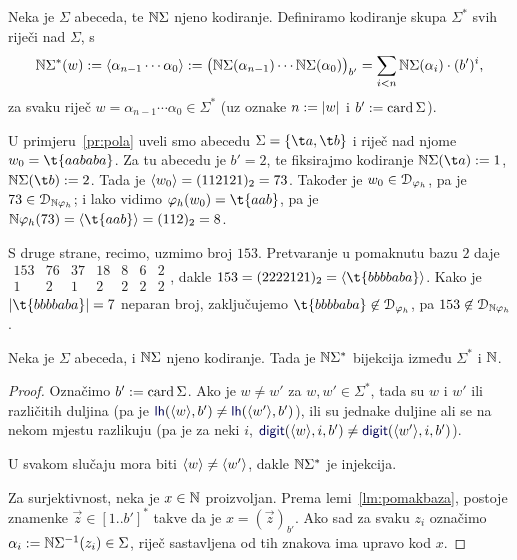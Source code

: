 \begin{definicija}
Neka je $\Sigma$ abeceda, te ${\mathbb N}\Sigma$ njeno kodiranje. Definiramo kodiranje skupa $\Sigma^*$ svih riječi nad $\Sigma$, s
\begin{equation}\label{eq:kodNSz}
    {\mathbb N}\Sigma^*(w):=\langle\alpha_{n-1}\dotsm\alpha_0\rangle:=\bigl({\mathbb N}\Sigma(\alpha_{n-1})\dotsm{\mathbb N}\Sigma(\alpha_0)\bigr)_{b'}=\sum_{i<n}{\mathbb N}\Sigma(\alpha_i)\cdot(b')^i\text,
\end{equation}
za svaku riječ $w=\alpha_{n-1}\dotsm\alpha_0\in\Sigma^*$ (uz oznake $n:=\lvert w\rvert$ i $b':=\operatorname{card}\Sigma$).
\end{definicija}

\begin{primjer}
U primjeru~\ref{pr:pola} uveli smo abecedu $\Sigma=\{\t a,\t b\}$ i riječ nad njome $w_0=\t{aababa}$. Za tu abecedu je $b'=2$, te fiksirajmo kodiranje $\N\Sigma(\t a):=1$, $\N\Sigma(\t b):=2$. Tada je $\langle w_0\rangle=(112121)_2=73$.
Također je $w_0\in\mathcal D_{\varphi_h}$, pa je $73\in\mathcal D_{{\mathbb N}\varphi_h}$; i lako vidimo $\varphi_h(w_0)=\t{aab}$, pa je
$\N\varphi_h(73)=\kr{\t{aab}}=(112)_2=8$.

S druge strane, recimo, uzmimo broj $153$. Pretvaranje u pomaknutu bazu $2$ daje
$\begin{array}{rrrrrrr}
153 & 76 & 37 & 18 & 8 & 6 & 2\\\hline
1 & 2 & 1 & 2 & 2 & 2 & 2
\end{array}$, dakle $153=(2222121)_2=\kr{\t{bbbbaba}}$. Kako je $\dulj{\t{bbbbaba}}=7$ neparan broj, zaključujemo $\t{bbbbaba}\not\in\dom{\varphi_h}$, pa $153\not\in\mathcal D_{{\mathbb N}\varphi_h}$.
\end{primjer}

\begin{propozicija}\label{pp:bijkr}
Neka je $\Sigma$ abeceda, i ${\mathbb N}\Sigma$ njeno kodiranje. Tada je ${\mathbb N}\Sigma^*$ bijekcija između $\Sigma^*$ i ${\mathbb N}$.
\end{propozicija}
\begin{proof}
Označimo $b':=\operatorname{card}\Sigma$. Ako je $w\not=w'$ za $w,w'\in\Sigma^*$, tada su $w$ i $w'$ ili različitih duljina (pa je $\f{lh}(\kr w,b')\not=\f{lh}(\kr{w'},b')$), ili su jednake duljine ali se na nekom mjestu razlikuju (pa je za neki $i$, $\f{digit}(\kr w,i,b')\not=\f{digit}(\kr{w'},i,b')$).

U svakom slučaju mora biti $\langle w\rangle\not=\langle w'\rangle$, dakle ${\mathbb N}\Sigma^*$ je injekcija.

Za surjektivnost, neka je $x\in{\mathbb N}$ proizvoljan. Prema lemi~\ref{lm:pomakbaza}, postoje znamenke $\vec z\in[1..b']^*$ takve da je $x=(\vec z)_{b'}$. Ako sad za svaku $z_i$ označimo $\alpha_i:={\mathbb N}\Sigma^{-1}(z_i)\in\Sigma$, riječ sastavljena od tih znakova ima upravo kod $x$.
\end{proof}

